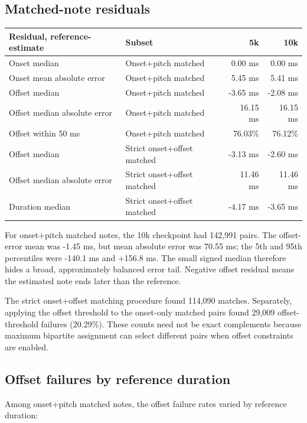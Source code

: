 \documentclass[11pt]{article}
\begin{document}
\subsection{Matched-note residuals}

\begin{center}
\begin{tabular}{llrr}
\toprule
\textbf{Residual, reference-estimate} & \textbf{Subset} &
\textbf{5k} & \textbf{10k} \\
\midrule
Onset median & Onset+pitch matched & 0.00 ms & 0.00 ms \\
Onset mean absolute error & Onset+pitch matched & 5.45 ms & 5.41 ms \\
Offset median & Onset+pitch matched & -3.65 ms & -2.08 ms \\
Offset median absolute error & Onset+pitch matched & 16.15 ms & 16.15 ms \\
Offset within 50 ms & Onset+pitch matched & 76.03\% & 76.12\% \\
Offset median & Strict onset+offset matched & -3.13 ms & -2.60 ms \\
Offset median absolute error & Strict onset+offset matched & 11.46 ms & 11.46 ms \\
Duration median & Strict onset+offset matched & -4.17 ms & -3.65 ms \\
\bottomrule
\end{tabular}
\end{center}

For onset+pitch matched notes, the 10k checkpoint had 142,991 pairs.
The offset-error mean was -1.45 ms, but mean absolute error was 70.55 ms;
the 5th and 95th percentiles were -140.1 ms and +156.8 ms. The small signed
median therefore hides a broad, approximately balanced error tail. Negative
offset residual means the estimated note ends later than the reference.

The strict onset+offset matching procedure found 114,090 matches. Separately,
applying the offset threshold to the onset-only matched pairs found 29,009
offset-threshold failures (20.29\%). These counts need not be exact
complements because maximum bipartite assignment can select different pairs
when offset constraints are enabled.

\subsection{Offset failures by reference duration}

Among onset+pitch matched notes, the offset failure rates varied by
reference duration:
\end{document}
